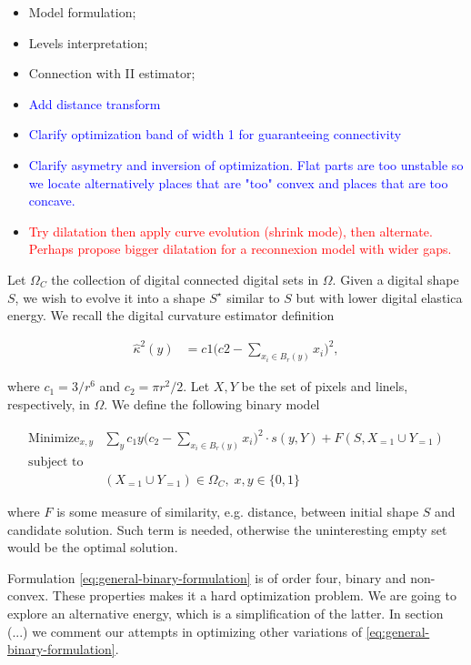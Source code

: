 \documentclass[runningheads]{llncs}
\newcommand{\todo}[1]{{\textcolor{blue}{#1}}}
\newcommand{\test}[1]{{\textcolor{red}{#1}}}
\begin{document}
\begin{itemize}
	\item{Model formulation;}
	\item{Levels interpretation;}
    \item{Connection with II estimator;}	
    \item{\todo{Add distance transform}}
    \item{\todo{Clarify optimization band of width 1 for guaranteeing connectivity}}
    \item{\todo{Clarify asymetry and inversion of optimization. Flat parts are too unstable so we locate alternatively places that are "too" convex and places that are too concave.}}
    \item{\test{Try dilatation then apply curve evolution (shrink mode), then alternate. Perhaps propose bigger dilatation for a reconnexion model with wider gaps.}}
\end{itemize}

\hrulefill

	Let $\Omega_C$ the collection of digital connected digital sets in $\Omega$. Given a digital shape $S$, we wish to evolve it into a shape $S^\star$ similar to $S$ but with lower digital elastica energy. We recall the digital curvature estimator definition
	
\begin{align}
	\hat{\kappa}^2(y) &= c1\Big( c2 - \sum_{x_i \in B_r(y)}{x_i} \Big)^2, 
	\label{eq:curvature-estimator-pixels}
\end{align}

where $c_1=3/r^6$ and $c_2=\pi r^2/2$. Let $X,Y$ be the set of pixels and linels, respectively, in $\Omega$. We define the following binary model
		
\begin{align}
\text{Minimize}_{x,y} & \sum_{y}{c_1y \Big(c_2 - \sum_{x_i \in B_r(y)}{x_i}\Big)^2	 } \cdot s(y,Y) \nonumber + F(S,X_{=1} \cup Y_{=1}) \nonumber \\
\text{subject to} & \nonumber \\
& (X_{=1} \cup Y_{=1}) \in \Omega_C, \; x,y \in \{0,1\}
\label{eq:general-binary-formulation}
\end{align}
	


where $F$ is some measure of similarity, e.g. distance, between initial shape $S$ and candidate solution. Such term is needed, otherwise the uninteresting empty set would be the optimal solution.

Formulation \eqref{eq:general-binary-formulation} is of order four, binary and non-convex. These properties makes it a hard optimization problem. We are going to explore an alternative energy, which is a simplification of the latter. In section (...) we comment our attempts in optimizing  other variations of \eqref{eq:general-binary-formulation}.
\end{document}
